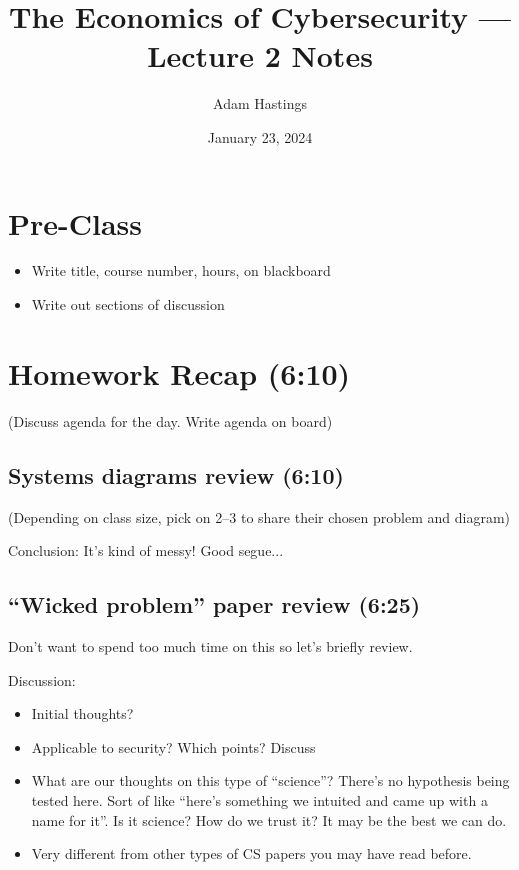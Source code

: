 \documentclass[11pt]{article}
\title{The Economics of Cybersecurity --- Lecture 2 Notes}
\date{January 23, 2024}
\author{Adam Hastings}
\begin{document}
\maketitle

\section*{Pre-Class}
\begin{itemize}
    \item Write title, course number, hours, on blackboard
    \item Write out sections of discussion
\end{itemize}

\section{Homework Recap (6:10)} 

(Discuss agenda for the day. Write agenda on board)

\subsection{Systems diagrams review (6:10)}

(Depending on class size, pick on 2--3 to share their chosen problem and diagram)

Conclusion: It's kind of messy! Good segue...

\subsection{``Wicked problem'' paper review (6:25)}

Don't want to spend too much time on this so let's briefly review.

Discussion:
\begin{itemize}
    \item Initial thoughts?
    \item Applicable to security? Which points? Discuss
    \item What are our thoughts on this type of ``science''? There's no hypothesis being tested here. Sort of like ``here's something we intuited and came up with a name for it''. Is it science? How do we trust it? It may be the best we can do. 
    \item Very different from other types of CS papers you may have read before.
\end{itemize}
\end{document}
